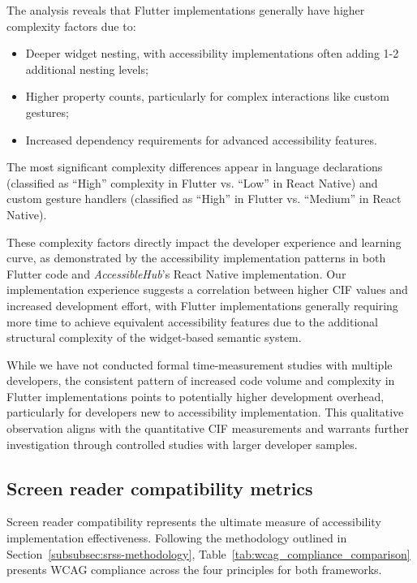 The analysis reveals that Flutter implementations generally have higher complexity factors due to:

\begin{itemize}
    \item Deeper widget nesting, with accessibility implementations often adding 1-2 additional nesting levels;
    \item Higher property counts, particularly for complex interactions like custom gestures;
    \item Increased dependency requirements for advanced accessibility features.
\end{itemize}

The most significant complexity differences appear in language declarations (classified as ``High'' complexity in Flutter vs. ``Low'' in React Native) and custom gesture handlers (classified as ``High'' in Flutter vs. ``Medium'' in React Native).

These complexity factors directly impact the developer experience and learning curve, as demonstrated by the accessibility implementation patterns in both Flutter code and \textit{AccessibleHub}'s React Native implementation. Our implementation experience suggests a correlation between higher CIF values and increased development effort, with Flutter implementations generally requiring more time to achieve equivalent accessibility features due to the additional structural complexity of the widget-based semantic system.

While we have not conducted formal time-measurement studies with multiple developers, the consistent pattern of increased code volume and complexity in Flutter implementations points to potentially higher development overhead, particularly for developers new to accessibility implementation. This qualitative observation aligns with the quantitative CIF measurements and warrants further investigation through controlled studies with larger developer samples.

\subsection{Screen reader compatibility metrics}
\label{subsec:screen-reader-metrics}

Screen reader compatibility represents the ultimate measure of accessibility implementation effectiveness. Following the methodology outlined in Section~\ref{subsubsec:srss-methodology}, Table~\ref{tab:wcag_compliance_comparison} presents WCAG compliance across the four principles for both frameworks.

